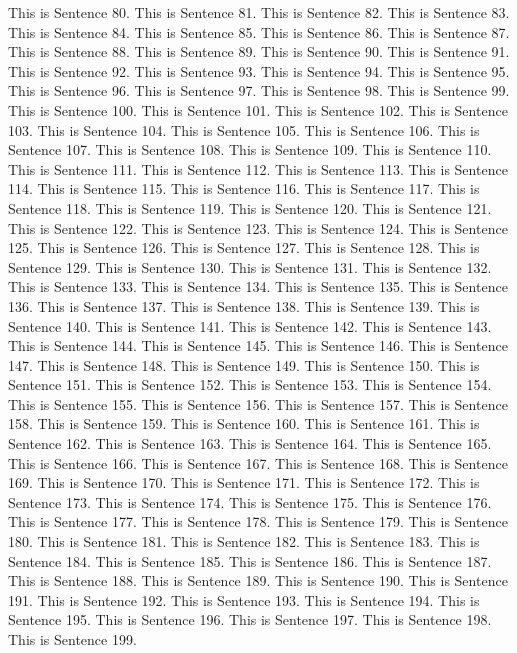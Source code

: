\documentclass{article}
\begin{document}
This is Sentence 80.
This is Sentence 81.
This is Sentence 82.
This is Sentence 83.
This is Sentence 84.
This is Sentence 85.
This is Sentence 86.
This is Sentence 87.
This is Sentence 88.
This is Sentence 89.
This is Sentence 90.
This is Sentence 91.
This is Sentence 92.
This is Sentence 93.
This is Sentence 94.
This is Sentence 95.
This is Sentence 96.
This is Sentence 97.
This is Sentence 98.
This is Sentence 99.
This is Sentence 100.
This is Sentence 101.
This is Sentence 102.
This is Sentence 103.
This is Sentence 104.
This is Sentence 105.
This is Sentence 106.
This is Sentence 107.
This is Sentence 108.
This is Sentence 109.
This is Sentence 110.
This is Sentence 111.
This is Sentence 112.
This is Sentence 113.
This is Sentence 114.
This is Sentence 115.
This is Sentence 116.
This is Sentence 117.
This is Sentence 118.
This is Sentence 119.
This is Sentence 120.
This is Sentence 121.
This is Sentence 122.
This is Sentence 123.
This is Sentence 124.
This is Sentence 125.
This is Sentence 126.
This is Sentence 127.
This is Sentence 128.
This is Sentence 129.
This is Sentence 130.
This is Sentence 131.
This is Sentence 132.
This is Sentence 133.
This is Sentence 134.
This is Sentence 135.
This is Sentence 136.
This is Sentence 137.
This is Sentence 138.
This is Sentence 139.
This is Sentence 140.
This is Sentence 141.
This is Sentence 142.
This is Sentence 143.
This is Sentence 144.
This is Sentence 145.
This is Sentence 146.
This is Sentence 147.
This is Sentence 148.
This is Sentence 149.
This is Sentence 150.
This is Sentence 151.
This is Sentence 152.
This is Sentence 153.
This is Sentence 154.
This is Sentence 155.
This is Sentence 156.
This is Sentence 157.
This is Sentence 158.
This is Sentence 159.
This is Sentence 160.
This is Sentence 161.
This is Sentence 162.
This is Sentence 163.
This is Sentence 164.
This is Sentence 165.
This is Sentence 166.
This is Sentence 167.
This is Sentence 168.
This is Sentence 169.
This is Sentence 170.
This is Sentence 171.
This is Sentence 172.
This is Sentence 173.
This is Sentence 174.
This is Sentence 175.
This is Sentence 176.
This is Sentence 177.
This is Sentence 178.
This is Sentence 179.
This is Sentence 180.
This is Sentence 181.
This is Sentence 182.
This is Sentence 183.
This is Sentence 184.
This is Sentence 185.
This is Sentence 186.
This is Sentence 187.
This is Sentence 188.
This is Sentence 189.
This is Sentence 190.
This is Sentence 191.
This is Sentence 192.
This is Sentence 193.
This is Sentence 194.
This is Sentence 195.
This is Sentence 196.
This is Sentence 197.
This is Sentence 198.
This is Sentence 199.
\end{document}
